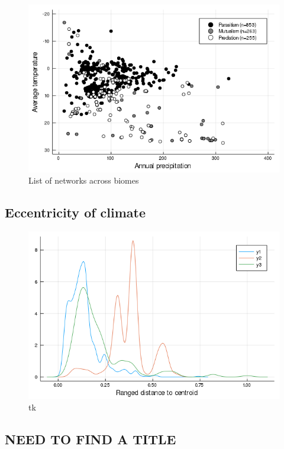 \begin{figure}
\centering
\includegraphics{figures/figure_02.png}
\caption{List of networks across biomes\label{fig:biomes}}
\end{figure}

\hypertarget{eccentricity-of-climate}{%
\subsection{Eccentricity of climate}\label{eccentricity-of-climate}}

\begin{figure}
\centering
\includegraphics{figures/figure_05_b.png}
\caption{tk\label{fig:ecc}}
\end{figure}

\hypertarget{need-to-find-a-title}{%
\subsection{NEED TO FIND A TITLE}\label{need-to-find-a-title}}

